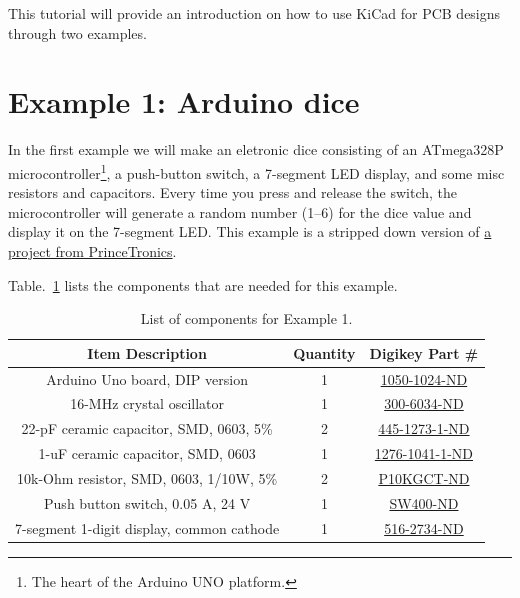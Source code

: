 \documentclass[12pt,letterpaper]{scrartcl}
\begin{document}
This tutorial will provide an introduction on how to use KiCad for PCB designs through two examples. 

\newpage
\section{Example 1: Arduino dice}
In the first example we will make an eletronic dice consisting of an ATmega328P microcontroller\footnote{The heart of the Arduino UNO platform.}, a push-button switch, a 7-segment LED display, and some misc resistors and capacitors. Every time you press and release the switch, the microcontroller will generate a random number (1--6) for the dice value and display it on the 7-segment LED. This example is a stripped down version of \href{http://www.princetronics.com/electronic-dice/}{a project from PrinceTronics}. 

Table.~\ref{tab:example1} lists the components that are needed for this example.

\begin{table}[h]
\centering
\caption{List of components for Example 1.}
\begin{tabular}{|c|c|c|}
\hline \textbf{Item Description} & \textbf{Quantity} & \textbf{Digikey Part \#} \\ 
\hline \hline  Arduino Uno board, DIP version & 1 & \href{http://www.digikey.com/product-detail/en/A000066/1050-1024-ND/2784006}{1050-1024-ND} \\ 
\hline  16-MHz crystal oscillator &  1 & \href{http://www.digikey.com/product-search/en?KeyWords=300-8499-ND}{300-6034-ND} \\ 
\hline  22-pF ceramic capacitor, SMD, 0603, 5\% & 2 & \href{http://www.digikey.com/product-detail/en/C1608C0G1H220J080AA/445-1273-1-ND/567670}{445-1273-1-ND}  \\ 
\hline  1-uF ceramic capacitor, SMD, 0603 & 1 & \href{http://www.digikey.com/product-detail/en/CL10F105ZP8NNNC/1276-1041-1-ND/3889127}{1276-1041-1-ND}  \\ 
\hline  10k-Ohm resistor, SMD, 0603, 1/10W, 5\% & 2 & \href{http://www.digikey.com/product-detail/en/ERJ-3GEYJ103V/P10KGCT-ND/134717}{P10KGCT-ND} \\ 
\hline  Push button switch, 0.05 A, 24 V  & 1 & \href{http://www.digikey.com/product-search/en?KeyWords=SW400-ND}{SW400-ND} \\ 
\hline  7-segment 1-digit display, 
common cathode & 1 & \href{http://www.digikey.com/product-detail/en/HDSP-313E/516-2734-ND/2219051}{516-2734-ND} \\ 
\hline 
\end{tabular} 
\label{tab:example1}
\end{table}
\end{document}
